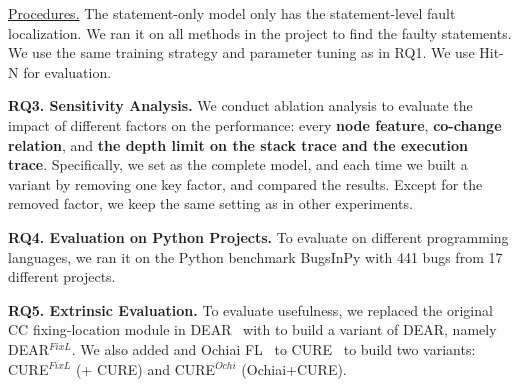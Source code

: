 \underline{Procedures.}
The statement-only model only has the statement-level fault
localization. We ran it on all methods in the project to find the
faulty statements. We use the same training strategy and parameter
tuning as in RQ1.
We use Hit-N for evaluation.

\vspace{2pt}
{\bf RQ3. Sensitivity Analysis.}  We conduct ablation
analysis to evaluate the impact of different factors on the
performance: every {\bf node feature}, {\bf co-change
relation}, and {\bf the depth limit on the stack trace and the
execution trace}. Specifically, we set {\tool} as the complete model,
and each time we built a variant by removing one key factor,
and compared the results.
Except for the removed factor, we keep the same setting
as in other experiments.

\vspace{2pt}
{\bf RQ4. Evaluation on Python Projects.}
%
To evaluate {\tool} on different programming languages, we ran it on the Python benchmark BugsInPy \cite{BugsInPy,widyasari2020bugsinpy} with 441 bugs from 17 different projects.



\vspace{2pt}
{\bf RQ5. Extrinsic Evaluation.} To evaluate usefulness, we replaced
the original CC fixing-location module in DEAR~\cite{icse22} with
{\tool} to build a variant of DEAR, namely DEAR$^{FixL}$.  We also
added {\tool} and Ochiai FL~\cite{Ochiai} to CURE~\cite{cure-icse21}
to build two variants: CURE$^{FixL}$ (\tool + CURE) and CURE$^{Ochi}$
(Ochiai+CURE).



